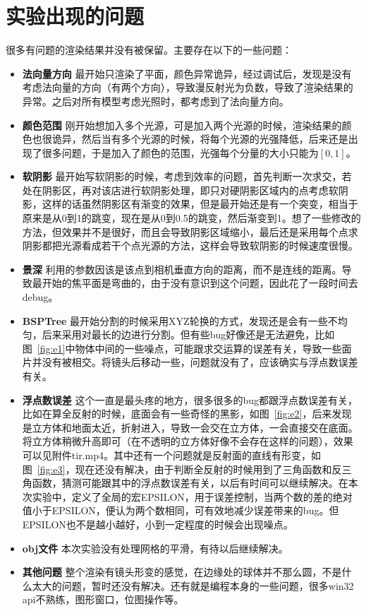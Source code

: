 \documentclass{article}
\begin{document}
\section{实验出现的问题}
很多有问题的渲染结果并没有被保留。主要存在以下的一些问题：
\begin{itemize}
\item \textbf{法向量方向}
最开始只渲染了平面，颜色异常诡异，经过调试后，发现是没有考虑法向量的方向（有两个方向），导致漫反射光为负数，导致了渲染结果的异常。之后对所有模型考虑光照时，都考虑到了法向量方向。
\item \textbf{颜色范围}
刚开始想加入多个光源，可是加入两个光源的时候，渲染结果的颜色也很诡异，然后当有多个光源的时候，将每个光源的光强降低，后来还是出现了很多问题，于是加入了颜色的范围，光强每个分量的大小只能为$[0,1]$。
\item \textbf{软阴影}
最开始写软阴影的时候，考虑到效率的问题，首先判断一次求交，若处在阴影区，再对该店进行软阴影处理，即只对硬阴影区域内的点考虑软阴影，这样的话虽然阴影区有渐变的效果，但是最开始还是有一个突变，相当于原来是从0到1的跳变，现在是从0到0.5的跳变，然后渐变到1。想了一些修改的方法，但效果并不是很好，而且会导致阴影区域缩小，最后还是采用每个点求阴影都把光源看成若干个点光源的方法，这样会导致软阴影的时候速度很慢。
\item \textbf{景深}
利用的参数因该是该点到相机垂直方向的距离，而不是连线的距离。导致最开始的焦平面是弯曲的，由于没有意识到这个问题，因此花了一段时间去debug。
\item \textbf{BSPTree}
最开始分割的时候采用XYZ轮换的方式，发现还是会有一些不均匀，后来采用对最长的边进行分割。但有些bug好像还是无法避免，比如图~\ref{fig:e1}中物体中间的一些噪点，可能跟求交运算的误差有关，导致一些面片并没有被相交。将镜头后移动一些，问题就没有了，应该确实与浮点数误差有关。
\item \textbf{浮点数误差}
这个一直是最头疼的地方，很多很多的bug都跟浮点数误差有关，比如在算全反射的时候，底面会有一些奇怪的黑影，如图~\ref{fig:e2}，后来发现是立方体和地面太近，折射进入，导致一会交在立方体，一会直接交在底面。将立方体稍微升高即可（在不透明的立方体好像不会存在这样的问题），效果可以见附件tir.mp4。其中还有一个问题就是反射面的直线有形变，如图~\ref{fig:e3}，现在还没有解决，由于判断全反射的时候用到了三角函数和反三角函数，猜测可能跟其中的浮点数误差有关，以后有时间可以继续解决。在本次实验中，定义了全局的宏EPSILON，用于误差控制，当两个数的差的绝对值小于EPSILON，便认为两个数相同，可有效地减少误差带来的bug。但EPSILON也不是越小越好，小到一定程度的时候会出现噪点。
\item \textbf{obj文件}
本次实验没有处理网格的平滑，有待以后继续解决。
\item \textbf{其他问题}
整个渲染有镜头形变的感觉，在边缘处的球体并不那么圆，不是什么太大的问题，暂时还没有解决。还有就是编程本身的一些问题，很多win32 api不熟练，图形窗口，位图操作等。
\end{itemize}
\end{document}
